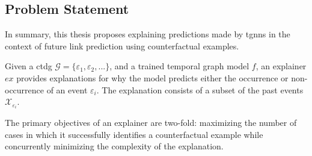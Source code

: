 

\subsection{Problem Statement}
\label{s_ProblemFormulation_ProblemStatement}

In summary, this thesis proposes explaining predictions made by \glspl{tgnn} in the context of future link prediction using counterfactual examples.

Given a \gls{ctdg} $\mathcal{G} = \{\varepsilon_{1}, \varepsilon_{2}, ...\}$, and a trained temporal graph model $f$, an explainer $ex$ provides explanations for why the model predicts either the occurrence or non-occurrence of an event $\varepsilon_{i}$. The explanation consists of a subset of the past events $\mathcal{X}_{\varepsilon_{i}}$.

The primary objectives of an explainer are two-fold: maximizing the number of cases in which it successfully identifies a counterfactual example while concurrently minimizing the complexity of the explanation.
